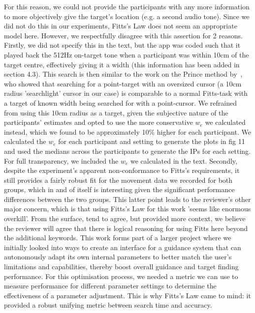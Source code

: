 \documentclass{article}
\begin{document}
\begin{itemize}
    For this reason, we could not provide the participants with any more information to more objectively give the target's location (e.g. a second audio tone).
    Since we did not do this in our experiments, Fitts's Law does not seem an appropriate model here. 
    However, we respectfully disagree with this assertion for 2 reasons.
    Firstly, we did not specify this in the text, but the app was coded such that it played back the 512Hz on-target tone when a participant was within 10cm of the target centre, effectively giving it a width (this information has been added in section 4.3).
    This search is then similar to the work on the Prince method by~\cite{kabbash1995prince}, who showed that searching for a point-target with an oversized cursor (a 10cm radius 'searchlight' cursor in our case) is comparable to a normal Fitts-task with a target of known width being searched for with a point-cursor.
    We refrained from using this 10cm radius as a target, given the subjective nature of the participants' estimates and opted to use the more conservative $w_e$ we calculated instead, which we found to be approximately 10\% higher for each participant.
    We calculated the $w_e$ for each participant and setting to generate the plots in fig 11 and used the medians across the participants to generate the IPs for each setting.
    For full transparency, we included the $w_e$ we calculated in the text.
    Secondly, despite the experiment's apparent non-conformance to Fitts's requirements, it still provides a fairly robust fit for the movement data we recorded for both groups, which in and of itself is interesting given the significant performance differences between the two groups.
    This latter point leads to the reviewer's other major concern, which is that using Fitts's Law for this work 'seems like enormous overkill'.
    From the surface, tend to agree, but provided more context, we believe the reviewer will agree that there is logical reasoning for using Fitts here beyond the additional keywords.
    This work forms part of a larger project where we initially looked into ways to create an interface for a guidance system that can autonomously adapt its own internal parameters to better match the user's limitations and capabilities, thereby boost overall guidance and target finding performance.
  For this optimisation process, we needed a metric we can use to measure performance for different parameter settings to determine the effectiveness of a parameter adjustment.
  This is why Fitts's Law came to mind: it provided a robust unifying metric between search time and accuracy.

\end{itemize}
\end{document}
